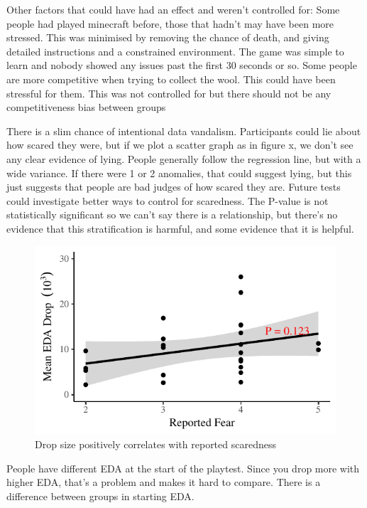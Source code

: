 \documentclass[12pt,a4paper]{article}\usepackage[]{graphicx}\usepackage[]{color}
\makeatletter
\def\maxwidth{ %
  \ifdim\Gin@nat@width>\linewidth
    \linewidth
  \else
    \Gin@nat@width
  \fi
}
\makeatother
\begin{document}
Other factors that could have had an effect and weren't controlled for:
Some people had played minecraft before, those that hadn't may have been more stressed. This was minimised by removing the chance of death, and giving detailed instructions and a constrained environment. The game was simple to learn and nobody showed any issues past the first 30 seconds or so.
Some people are more competitive when trying to collect the wool. This could have been stressful for them. This was not controlled for but there should not be any competitiveness bias between groups

There is a slim chance of intentional data vandalism. Participants could lie about how scared they were, but if we plot a scatter graph as in figure x, we don't see any clear evidence of lying. People generally follow the regression line, but with a wide variance. If there were 1 or 2 anomalies, that could suggest lying, but this just suggests that people are bad judges of how scared they are. Future tests could investigate better ways to control for scaredness. The P-value is not statistically significant so we can't say there is a relationship, but there's no evidence that this stratification is harmful, and some evidence that it is helpful.

\begin{figure}[htb]


{\centering \includegraphics[width=\maxwidth]{figure/ReportedScaredness-1} 

}



	\caption{Drop size positively correlates with reported scaredness}
	\label{fig:ReportedScaredness}
\end{figure}

People have different EDA at the start of the playtest. Since you drop more with higher EDA, that's a problem and makes it hard to compare. There is a difference between groups in starting EDA.
\end{document}
